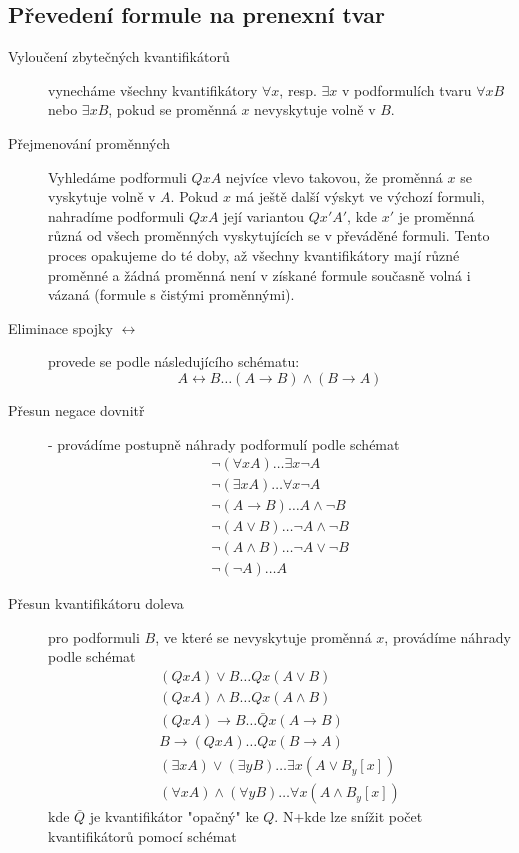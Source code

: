 \documentclass[a4paper, 11pt]{report}
\begin{document}
\subsection{Převedení formule na prenexní tvar}
\begin{description}
	\item[Vyloučení zbytečných kvantifikátorů] vynecháme všechny kvantifikátory $\forall x$, resp. $\exists x$ v podformulích tvaru $\forall x B$ nebo $\exists x B$, pokud se proměnná $x$ nevyskytuje volně v $B$.

	\item[Přejmenování proměnných] Vyhledáme podformuli $Q x A$ nejvíce vlevo takovou, že proměnná $x$ se vyskytuje volně v $A$. Pokud $x$ má ještě další výskyt ve výchozí formuli, nahradíme podformuli $Q x A$ její variantou $Q x' A'$, kde $x'$ je proměnná různá od všech proměnných vyskytujících se v převáděné formuli. Tento proces opakujeme do té doby, až všechny kvantifikátory mají různé proměnné a žádná proměnná není v získané formule současně volná i vázaná (formule s čistými proměnnými).

	\item[Eliminace spojky $\leftrightarrow$] provede se podle následujícího schématu:
	$$ A \leftrightarrow B \dots (A \to B) \land (B \to A)$$

	\item[Přesun negace dovnitř] - provádíme postupně náhrady podformulí podle schémat
	\begin{eqnarray*}
	& \lnot (\forall x A)	\dots \exists x \lnot A & \\
	& \lnot (\exists x A)	\dots \forall x \lnot A & \\
	& \lnot (A \to B)		\dots A \land \lnot B & \\
	& \lnot (A \lor B)	\dots \lnot A \land \lnot B & \\
	& \lnot (A \land B)	\dots \lnot A \lor \lnot B & \\
	& \lnot (\lnot A )	\dots A &
	\end{eqnarray*}

	\item[Přesun kvantifikátoru doleva] pro podformuli $B$, ve které se nevyskytuje proměnná $x$, provádíme náhrady podle schémat
	\begin{eqnarray*}
	& (QxA) \lor B	\dots Qx(A \lor B) &\\
	& (QxA) \land B	\dots Qx(A \land B) &\\
	& (QxA) \to B		\dots \bar{Q}x(A \to B) &\\
	& B \to (QxA)		\dots Qx(B \to A) &\\
	& (\exists x A) \lor (\exists y B) 	\dots \exists x (A \lor B_y[x]) &\\
	& (\forall x A) \land (\forall y B) 	\dots \forall x (A \land B_y[x]) &
	\end{eqnarray*}
	kde $\bar{Q}$ je kvantifikátor "opačný" ke $Q$. N+kde lze snížit počet kvantifikátorů pomocí schémat
\end{description}
\end{document}
